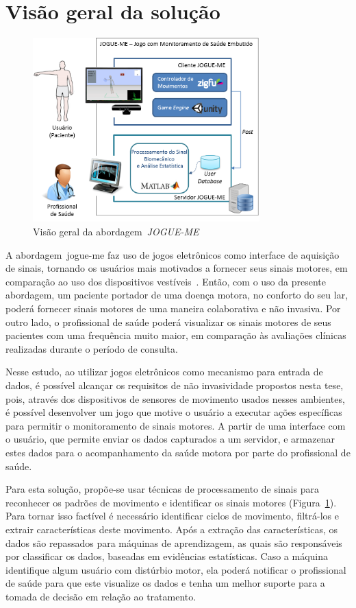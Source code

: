\section{Visão geral da solução}
\begin{figure}[h]
     \centering
     \includegraphics[width=0.78\textwidth]{./img/visaosistema.png}
     \caption{Visão geral da abordagem~\textit{JOGUE-ME}}
     \label{img:visaogeral}
\end{figure}
A abordagem~\ac{jogue-me} faz uso de jogos eletrônicos como interface de aquisição de sinais, tornando os usuários mais motivados a fornecer seus sinais motores, em comparação ao uso dos dispositivos vestíveis~\cite{alemdar}. Então, com o uso da presente abordagem, um paciente portador de uma doença motora, no conforto do seu lar, poderá fornecer sinais motores de uma maneira colaborativa e não invasiva. Por outro lado, o profissional de saúde poderá visualizar os sinais motores de seus pacientes com uma frequência muito maior, em comparação às avaliações clínicas realizadas durante o período de consulta. 

Nesse estudo, ao utilizar jogos eletrônicos como mecanismo para entrada de dados, é possível alcançar os requisitos de não invasividade propostos nesta tese, pois, através dos dispositivos de sensores de movimento usados nesses ambientes, é possível desenvolver um jogo que motive o usuário a executar ações específicas para permitir o monitoramento de sinais motores. A partir de uma interface com o usuário, que permite enviar os dados capturados a um servidor, e armazenar estes dados para o acompanhamento da saúde motora por parte do profissional de saúde.

Para esta solução, propõe-se usar técnicas de processamento de sinais para reconhecer os padrões de movimento e identificar os sinais motores (Figura~\ref{img:visaogeral}). Para tornar isso factível é necessário identificar ciclos de movimento, filtrá-los e extrair características deste movimento. Após a extração das características, os dados são repassados para máquinas de aprendizagem, as quais são responsáveis por classificar os dados, baseadas em evidências estatísticas. Caso a máquina identifique algum usuário com distúrbio motor, ela poderá notificar o profissional de saúde para que este visualize os dados e tenha um melhor suporte para a tomada de decisão em relação ao tratamento.

